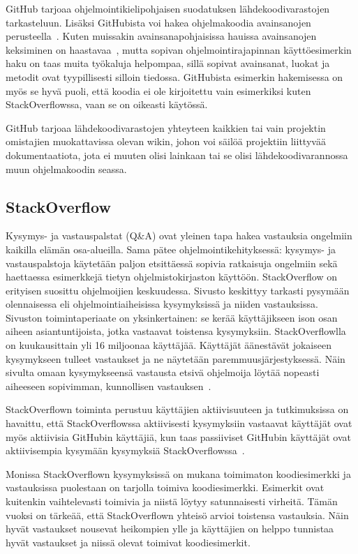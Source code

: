 \documentclass[finnish]{tktltiki2}
\theoremstyle{definition}
\theoremstyle{remark}
\begin{document}
GitHub tarjoaa ohjelmointikielipohjaisen suodatuksen lähdekoodivarastojen tarkasteluun. Lisäksi GitHubista voi hakea ohjelmakoodia avainsanojen perusteella~\cite{social-networking-meets-se}. Kuten muissakin avainsanapohjaisissa hauissa avainsanojen keksiminen on haastavaa~\cite{what-to-search-for}, mutta sopivan ohjelmointirajapinnan käyttöesimerkin haku on taas muita työkaluja helpompaa, sillä sopivat avainsanat, luokat ja metodit ovat tyypillisesti silloin tiedossa. GitHubista esimerkin hakemisessa on myös se hyvä puoli, että koodia ei ole kirjoitettu vain esimerkiksi kuten StackOverflowssa, vaan se on oikeasti käytössä.

GitHub tarjoaa lähdekoodivarastojen yhteyteen kaikkien tai vain projektin omistajien muokattavissa olevan wikin, johon voi säilöä projektiin liittyvää dokumentaatiota, jota ei muuten olisi lainkaan tai se olisi lähdekoodivarannossa muun ohjelmakoodin seassa.

\subsection{StackOverflow}
Kysymys- ja vastauspalstat (Q\&A) ovat yleinen tapa hakea vastauksia ongelmiin kaikilla elämän osa-alueilla. Sama pätee ohjelmointikehityksessä: kysymys- ja vastauspalstoja käytetään paljon etsittäessä sopivia ratkaisuja ongelmiin sekä haettaessa esimerkkejä tietyn ohjelmistokirjaston käyttöön. StackOverflow on erityisen suosittu ohjelmoijien keskuudessa. Sivusto keskittyy tarkasti pysymään olennaisessa eli ohjelmointiaiheisissa kysymyksissä ja niiden vastauksissa. Sivuston toimintaperiaate on yksinkertainen: se kerää käyttäjikseen ison osan aiheen asiantuntijoista, jotka vastaavat toistensa kysymyksiin. StackOverflowlla on kuukausittain yli 16 miljoonaa käyttäjää. Käyttäjät äänestävät jokaiseen kysymykseen tulleet vastaukset ja ne näytetään paremmuusjärjestyksessä. Näin sivulta omaan kysymykseensä vastausta etsivä ohjelmoija löytää nopeasti aiheeseen sopivimman, kunnollisen vastauksen~\cite{social-networking-meets-se}.

StackOverflown toiminta perustuu käyttäjien aktiivisuuteen ja tutkimuksissa on havaittu, että StackOverflowssa aktiivisesti kysymyksiin vastaavat käyttäjät ovat myös aktiivisia GitHubin käyttäjiä, kun taas passiiviset GitHubin käyttäjät ovat aktiivisempia kysymään kysymyksiä StackOverflowssa~\cite{stackoverflow-and-github}.

Monissa StackOverflown kysymyksissä on mukana toimimaton koodiesimerkki ja  vastauksissa puolestaan on tarjolla toimiva koodiesimerkki. Esimerkit ovat kuitenkin vaihtelevasti toimivia ja niistä löytyy satunnaisesti virheitä. Tämän vuoksi on tärkeää, että StackOverflown yhteisö arvioi toistensa vastauksia. Näin hyvät vastaukset nousevat heikompien ylle ja käyttäjien on helppo tunnistaa hyvät vastaukset ja niissä olevat toimivat koodiesimerkit.
\end{document}
